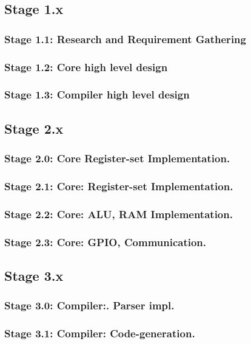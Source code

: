 \documentclass[11pt,a4paper]{report}
\begin{document}
\subsection*{Stage 1.x}
\subsubsection*{Stage 1.1: Research and Requirement Gathering}
\subsubsection*{Stage 1.2: Core high level design}
\subsubsection*{Stage 1.3: Compiler high level design}

\subsection*{Stage 2.x}
\subsubsection*{Stage 2.0: Core Register-set Implementation.}
\subsubsection*{Stage 2.1: Core: Register-set Implementation.}
\subsubsection*{Stage 2.2: Core: ALU, RAM Implementation.}
\subsubsection*{Stage 2.3: Core: GPIO, Communication.}

\subsection*{Stage 3.x}
\subsubsection*{Stage 3.0: Compiler:. Parser impl.}
\subsubsection*{Stage 3.1: Compiler: Code-generation.}
\end{document}
